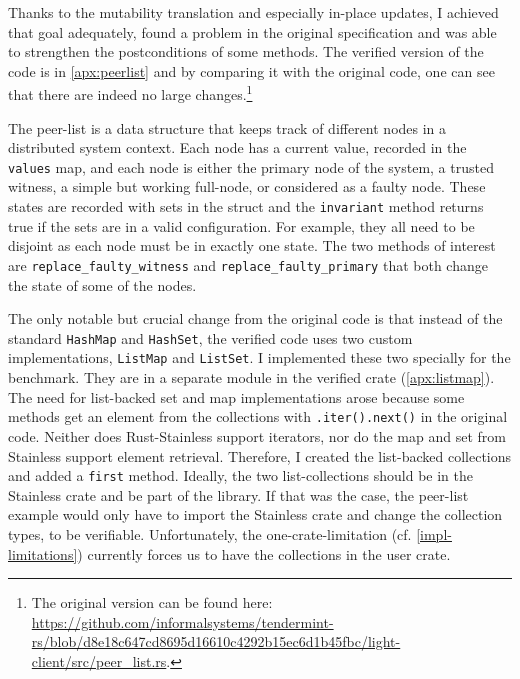Thanks to the mutability translation and especially in-place updates, I achieved
that goal adequately, found a problem in the original specification and was able
to strengthen the postconditions of some methods. The verified version of the
code is in \autoref{apx:peerlist} and by comparing it with the original code,
one can see that there are indeed no large changes.\footnote{The original
version can be found here:
\url{https://github.com/informalsystems/tendermint-rs/blob/d8e18c647cd8695d16610c4292b15ec6d1b45fbc/light-client/src/peer_list.rs}.}

The peer-list is a data structure that keeps track of different nodes in a
distributed system context. Each node has a current value, recorded in the
\lstinline!values! map, and each node is either the primary node of the system,
a trusted witness, a simple but working full-node, or considered as a faulty
node. These states are recorded with sets in the struct and the
\lstinline!invariant! method returns true if the sets are in a valid
configuration. For example, they all  need to be disjoint as each node must be
in exactly one state. The two methods of interest are
\lstinline!replace_faulty_witness! and \lstinline!replace_faulty_primary! that
both change the state of some of the nodes.

The only notable but crucial change from the original code is that instead of
the standard \lstinline!HashMap! and \lstinline!HashSet!, the verified code uses
two custom implementations, \lstinline!ListMap! and \lstinline!ListSet!. I
implemented these two specially for the benchmark. They are in a separate module
in the verified crate (\autoref{apx:listmap}). The need for list-backed set and
map implementations arose because some methods get an element from the
collections with \lstinline!.iter().next()! in the original code. Neither does
Rust-Stainless support iterators, nor do the map and set from Stainless support
element retrieval. Therefore, I created the list-backed collections and added a
\lstinline!first! method. Ideally, the two list-collections should be in the
Stainless crate and be part of the library. If that was the case, the peer-list
example would only have to import the Stainless crate and change  the collection
types, to be verifiable. Unfortunately, the one-crate-limitation (cf.
\autoref{impl-limitations}) currently forces us to have the collections in the
user crate.

